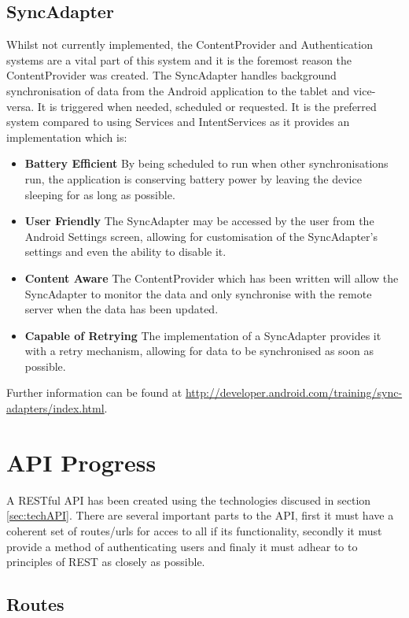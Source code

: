\documentclass[11pt,a4paper]{article}
\begin{document}
\subsection{SyncAdapter}
\label{sec:syncAdapter}
Whilst not currently implemented, the ContentProvider and Authentication systems are a vital part of this system and it is the foremost reason the ContentProvider was created. The SyncAdapter handles background synchronisation of data from the Android application to the tablet and vice-versa. It is triggered when needed, scheduled or requested. It is the preferred system compared to using Services and IntentServices as it provides an implementation which is:
\begin{itemize}
\item \textbf{Battery Efficient} By being scheduled to run when other synchronisations run, the application is conserving battery power by leaving the device sleeping for as long as possible.
\item \textbf{User Friendly} The SyncAdapter may be accessed by the user from the Android Settings screen, allowing for customisation of the SyncAdapter's settings and even the ability to disable it.
\item \textbf{Content Aware} The ContentProvider which has been written will allow the SyncAdapter to monitor the data and only synchronise with the remote server when the data has been updated.
\item \textbf{Capable of Retrying} The implementation of a SyncAdapter provides it with a retry mechanism, allowing for data to be synchronised as soon as possible.
\end{itemize}

Further information can be found at \url{http://developer.android.com/training/sync-adapters/index.html}.


\section{API Progress}

A RESTful API has been created using the technologies discused in section \ref{sec:techAPI}. There are several important parts to the API, first it must have a coherent set of routes/urls for acces to all if its functionality, secondly it must provide a method of authenticating users and finaly it must adhear to to principles of REST as closely as possible. 

\subsection{Routes}
\end{document}
